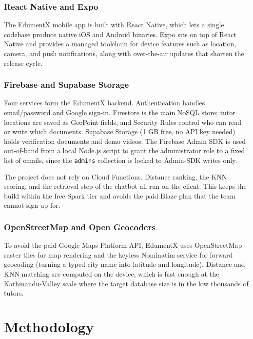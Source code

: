 \documentclass[12pt]{report}
\begin{document}
\subsection{React Native and Expo}

The EdumentX mobile app is built with React Native, which
lets a single codebase produce native iOS and Android
binaries. Expo sits on top of React Native and provides a
managed toolchain for device features such as location,
camera, and push notifications, along with over-the-air
updates that shorten the release cycle.

\subsection{Firebase and Supabase Storage}

Four services form the EdumentX backend. Authentication
handles email/password and Google sign-in. Firestore is the
main NoSQL store; tutor locations are saved as GeoPoint
fields, and Security Rules control who can read or write
which documents. Supabase Storage (1 GB free, no API key
needed) holds verification documents and demo videos. The
Firebase Admin SDK is used out-of-band from a local Node.js
script to grant the administrator role to a fixed list of
emails, since the \texttt{admins} collection is locked to
Admin-SDK writes only.

The project does not rely on Cloud Functions. Distance
ranking, the KNN scoring, and the retrieval step of the
chatbot all run on the client. This keeps the build within
the free Spark tier and avoids the paid Blaze plan that the
team cannot sign up for.

\subsection{OpenStreetMap and Open Geocoders}

To avoid the paid Google Maps Platform API, EdumentX uses
OpenStreetMap raster tiles for map rendering and the
keyless Nominatim service for forward geocoding (turning a
typed city name into latitude and longitude). Distance and
KNN matching are computed on the device, which is fast
enough at the Kathmandu-Valley scale where the target
database size is in the low thousands of tutors.

\chapter{Methodology}
\end{document}
